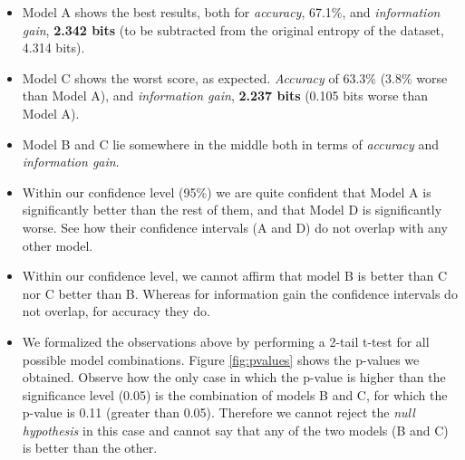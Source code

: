 \documentclass[10pt,journal,compsoc, onecolumn]{IEEEtran}
\begin{document}
\begin{table}[]
    \centering
    \caption{Mean Accuracy and Information Gain per model and improvement over Naïve Bayes classifier - 10 repetitions}
    \label{tab:results}
\end{table} 

\begin{itemize}
    \item Model A shows the best results, both for \textit{accuracy}, 67.1\%, and \textit{information gain}, \textbf{2.342 bits} (to be subtracted from the original entropy of the dataset, 4.314 bits). 
    \item Model C shows the worst score, as expected. \textit{Accuracy} of 63.3\% (3.8\% worse than Model A), and \textit{information gain}, \textbf{2.237 bits} (0.105 bits worse than Model A).
    \item Model B and C lie somewhere in the middle both in terms of \textit{accuracy} and \textit{information gain}.
    \item Within our confidence level (95\%) we are quite confident that Model A is significantly better than the rest of them, and that Model D is significantly worse. See how their confidence intervals (A and D) do not overlap with any other model.
    \item Within our confidence level, we cannot affirm that model B is better than C nor C better than B. Whereas for information gain the confidence intervals do not overlap, for accuracy they do.
    \item We formalized the observations above by performing a 2-tail t-test for all possible model combinations. Figure \ref{fig:pvalues} shows the p-values we obtained. Observe how the only case in which the p-value is higher than the significance level (0.05) is the combination of models B and C, for which the p-value is 0.11 (greater than 0.05). Therefore we cannot reject the \emph{null hypothesis} in this case and cannot say that any of the two models (B and C) is better than the other.
\end{itemize}
\end{document}
